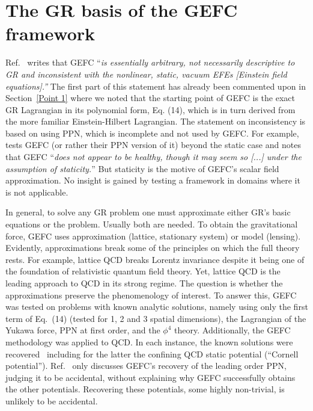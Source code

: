 \documentclass[superscriptaddress,amsmath,amssymb,nofootinbib]{revtex4}
\begin{document}
\section{The GR basis of the  GEFC framework \label{Point 3}} 
%
Ref.~\cite{Barker:2023xsx} writes that GEFC ``{\it is essentially arbitrary, not necessarily descriptive to GR and inconsistent with the nonlinear, static, vacuum EFEs [Einstein field equations].''}  
The first part of this statement has already been commented upon in Section~\ref{Point 1} where we noted that the starting point of  GEFC  is 
the exact GR Lagrangian in its polynomial form, Eq. (14), which is in turn derived from the more familiar Einstein-Hilbert Lagrangian.  
The statement on inconsistency is based on using PPN, which is incomplete and not used by GEFC. For example, \cite{Barker:2023xsx} tests 
GEFC (or rather their PPN version of it) beyond the static case and notes that GEFC ``{\it does not appear to be healthy, though it may seem so [...] 
under the assumption of staticity.}'' But staticity is the motive of GEFC's scalar field approximation. No insight is gained by testing a framework in domains 
where it is not applicable.


In general, to solve any GR problem one must approximate either GR's basic equations or the problem. Usually both are needed.
To obtain the gravitational force, GEFC uses approximation (lattice, stationary system) or model (lensing). 
Evidently, approximations break some of the principles on which the full theory rests.
 For example, lattice QCD breaks Lorentz invariance despite it being one of the foundation of relativistic quantum field theory. 
 Yet, lattice QCD is the leading approach to QCD in its strong regime. 
The question is whether the approximations preserve the phenomenology of interest. To answer this, GEFC was tested on problems with known analytic solutions, namely 
using only the first term of Eq.~(14) (tested for 1, 2 and 3 spatial dimensions), 
the Lagrangian of the Yukawa force, 
PPN at first order, and 
the $\phi^4$ theory. 
Additionally, the GEFC methodology was applied to QCD. 
In each instance, the known solutions were recovered~\cite{Deur:2016bwq} including for the latter the confining QCD static potential (``Cornell potential''\cite{Eichten:1974af}). 
Ref.~\cite{Barker:2023xsx} only discusses GEFC's recovery of the leading order PPN, 
judging it to be accidental, without  explaining why GEFC successfully obtains the other potentials. 
Recovering these potentials, some highly non-trivial, is unlikely to be accidental.
\end{document}
